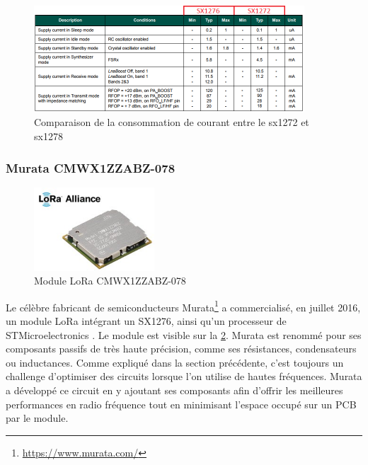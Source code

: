 \begin{figure}[ht!]
    \centering
    \includegraphics[width=0.9\textwidth]{Figures/Hardware/sx1272_78_current_consumption.PNG}
    \caption{Comparaison de la consommation de courant entre le sx1272 et sx1278}
    \label{fig-sx1272_78_current_consumption}
\end{figure}


\FloatBarrier
\subsubsection{Murata CMWX1ZZABZ-078}
\label{sec-hardware_lora_module}
\begin{figure}[ht!]
    \centering
    \includegraphics[width=0.4\textwidth]{Figures/Hardware/murata_module_image.jpg}
    \caption{Module LoRa CMWX1ZZABZ-078}
    \label{fig-murata_module_image}
\end{figure}

Le célèbre fabricant de semiconducteurs Murata\footnote{\url{https://www.murata.com/}} a commercialisé, en juillet 2016,  un module LoRa intégrant un SX1276, ainsi qu'un processeur de STMicroelectronics \cite{Muratala5:online}. Le module est visible sur la \cref{fig-murata_module_image}. Murata est renommé pour ses composants passifs de très haute précision, comme ses résistances, condensateurs ou inductances. Comme expliqué dans la section précédente, c'est toujours un challenge d'optimiser des circuits lorsque l'on utilise de hautes fréquences. Murata a développé ce circuit en y ajoutant ses composants afin d'offrir les meilleures performances en radio fréquence tout en minimisant l'espace occupé sur un PCB par le module.\\

